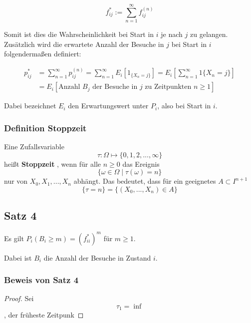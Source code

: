 \documentclass[a4paper]{article}
\begin{document}
\[
f_{ij} ^{*} := \sum_{n=1}^{\infty} f_{ij} ^{(n)}
\] 

Somit ist dies die Wahrscheinlichkeit bei Start in $i$ je nach $j$ zu gelangen.
\\

Zusätzlich wird die erwartete Anzahl der Besuche in $j$ bei Start in $i$ folgendermaßen definiert:

\begin{align*}
	p_{ij} ^{*} &=
	\sum_{n=1}^{\infty} p_{ij} ^{(n)} 
				= \sum_{n=1}^{\infty} E_i \left[
		1_{\{
				X_n = j
		\}}  
	\right] 
			  = E_i \left[
				  \sum_{n=1}^{\infty} 1\{
				  	X_n = j
				  \} 
			  \right]  \\
			  &= E_i \left[
				  \text{Anzahl $B_j$ der Besuche in $j$ zu Zeitpunkten $n \geq 1$}
			  \right] 
\end{align*}

Dabei bezeichnet $E_i$ den Erwartungswert unter $P_i$, also bei Start in $i$.

\subsubsection{Definition Stoppzeit}
Eine Zufallsvariable 
\[
\tau : \Omega \mapsto \{
	0, 1, 2, ..., \infty
\} 
\] 
heißt \textbf{Stoppzeit} , wenn für alle $n \geq 0$ das Ereignis 
\[
\{
	\omega \in \Omega \; \vert \; \tau (\omega) = n
\} 
\] 
nur von $X_0, X_1 ,...,X_n$ abhängt. Das bedeutet, 
dass für ein geeignetes $A \subset I ^{n+1}$
\[
\{
	\tau = n
\} = \{
	\left(
		X_0, ..., X_n
	\right) \in A
\}
\] 

\subsection{Satz 4}

Es gilt $P_i(B_i \geq m) = \left(
	f_{ii} ^{*}
\right) ^{m}$ für $m \geq 1$.

Dabei ist $B_i$ die Anzahl der Besuche in Zustand $i$.

\subsubsection{Beweis von Satz 4}
\begin{proof}
	Sei 
	\[
	\tau_1 = \inf
	\] 
	, der früheste Zeitpunk
\end{proof}
\end{document}
